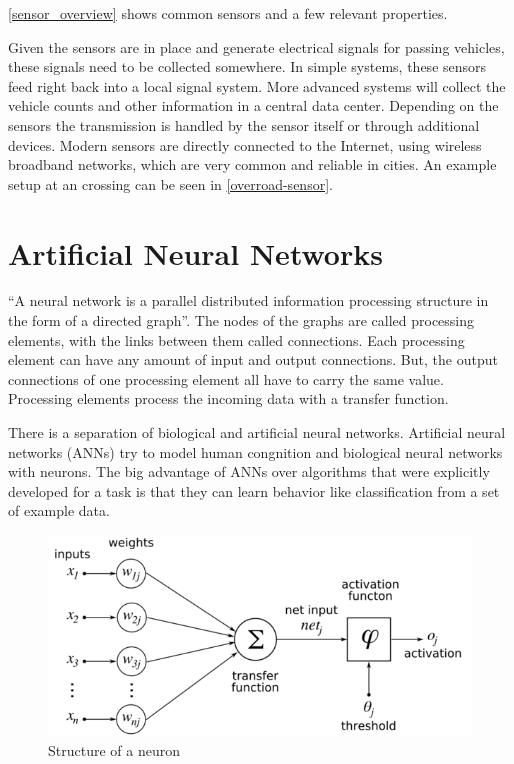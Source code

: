 \autoref{sensor_overview} shows common sensors and a few relevant properties.

Given the sensors are in place and generate electrical signals for passing vehicles, these signals need to be collected somewhere. In simple systems, these sensors feed right back into a local signal system. More advanced systems will collect the vehicle counts and other information in a central data center. Depending on the sensors the transmission is handled by the sensor itself or through additional devices. Modern sensors are directly connected to the Internet, using wireless broadband networks, which are very common and reliable in cities. An example setup at an crossing can be seen in \autoref{overroad-sensor}.

\section{Artificial Neural Networks}
\label{sec:ann}

``A neural network is a parallel distributed information processing structure in the
form of a directed graph''. \cite{introToNNs} The nodes of the graphs are called processing elements, with the links between them called connections. Each processing element can have any amount of input and output connections. But, the output connections of one processing element all have to carry the same value. Processing elements process the incoming data with a transfer function. \cite{introToNNs}

There is a separation of biological and artificial neural networks. Artificial neural networks (ANNs) try to model human congnition and biological neural networks with neurons. \cite{logicalCalculus1943} 
The big advantage of ANNs over algorithms that were explicitly developed for a task is that they can learn behavior like classification from a set of example data. 

\begin{figure}[ht]
	\centering
  \includegraphics[width=15cm]{figures/neuron_structure}
	\caption[Structure of a neuron]{Structure of a neuron \protect\footnotemark}
	\label{neuron}
\end{figure}

